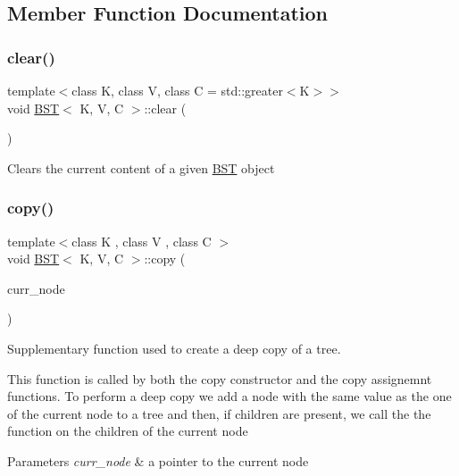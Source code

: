 \subsection{Member Function Documentation}
\mbox{\label{classBST_ab126433ade0fa5711341d80cd6a498ff}} 
\subsubsection{\texorpdfstring{clear()}{clear()}}
{\footnotesize\ttfamily template$<$class K, class V, class C = std\+::greater$<$\+K$>$$>$ \\
void \hyperlink{classBST}{B\+ST}$<$ K, V, C $>$\+::clear (\begin{DoxyParamCaption}{ }\end{DoxyParamCaption})\hspace{0.3cm}{\ttfamily [inline]}}

Clears the current content of a given \hyperlink{classBST}{B\+ST} object \mbox{\label{classBST_ae7caa3e87e5840631ecd016dcddca593}} 
\subsubsection{\texorpdfstring{copy()}{copy()}}
{\footnotesize\ttfamily template$<$class K , class V , class C $>$ \\
void \hyperlink{classBST}{B\+ST}$<$ K, V, C $>$\+::copy (\begin{DoxyParamCaption}\item[{const std\+::unique\+\_\+ptr$<$ Node $>$ \&}]{curr\+\_\+node }\end{DoxyParamCaption})}



Supplementary function used to create a deep copy of a tree. 

This function is called by both the copy constructor and the copy assignemnt functions. To perform a deep copy we add a node with the same value as the one of the current node to a tree and then, if children are present, we call the the function on the children of the current node


\begin{DoxyParams}{Parameters}
{\em curr\+\_\+node} & a pointer to the current node \\
\hline
\end{DoxyParams}
\mbox{\label{classBST_a78994b2b2383be06e93f2f3882bbc7e6}} 
